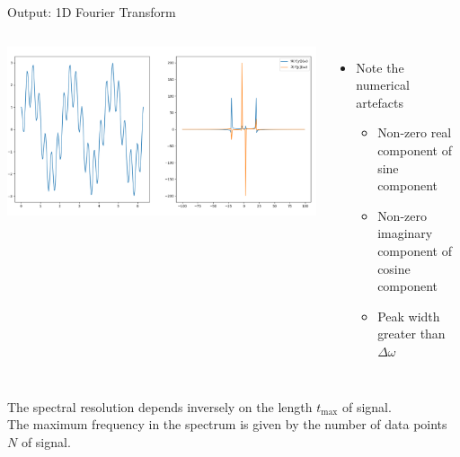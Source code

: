 
\begin{frame}{Output: 1D Fourier Transform}
%
\begin{columns}
\includegraphics[width=\linewidth]{./gfx/05-FFT-1D}
%
\begin{itemize}
\item Note the numerical artefacts
	\begin{itemize}
	\item Non-zero real component of sine component
	\item Non-zero imaginary component of cosine component
	\item Peak width greater than $\Delta \omega$
	\end{itemize}
\end{itemize}
\end{columns}
%
\begin{hintbox}
\footnotesize
The spectral resolution depends inversely on the length $t_{\text{max}}$ of signal.\\
The maximum frequency in the spectrum is given by the number of data points $N$ of signal.
\end{hintbox}
%
\end{frame}


